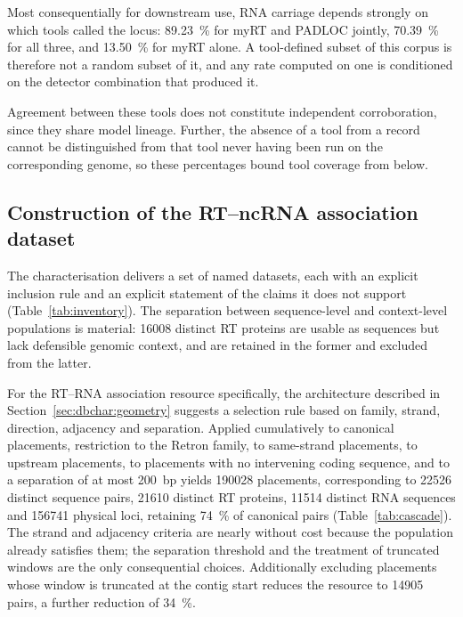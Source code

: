 Most consequentially for downstream use, RNA carriage depends strongly on which tools called the
locus: \SI{89.23}{\percent} for myRT and PADLOC jointly, \SI{70.39}{\percent} for all three, and
\SI{13.50}{\percent} for myRT alone. A tool-defined subset of this corpus is therefore not a random
subset of it, and any rate computed on one is conditioned on the detector combination that produced
it.

Agreement between these tools does not constitute independent corroboration, since they share model
lineage. Further, the absence of a tool from a record cannot be distinguished from that tool never
having been run on the corresponding genome, so these percentages bound tool coverage from below.

\subsection{Construction of the RT--ncRNA association dataset}
\label{sec:dbchar:dataset}

The characterisation delivers a set of named datasets, each with an explicit inclusion rule and an
explicit statement of the claims it does not support (Table~\ref{tab:inventory}). The separation
between sequence-level and context-level populations is material: \num{16008} distinct RT proteins
are usable as sequences but lack defensible genomic context, and are retained in the former and
excluded from the latter.

For the RT--RNA association resource specifically, the architecture described in
Section~\ref{sec:dbchar:geometry} suggests a selection rule based on family, strand, direction,
adjacency and separation. Applied cumulatively to canonical placements, restriction to the Retron
family, to same-strand placements, to upstream placements, to placements with no intervening coding
sequence, and to a separation of at most 200~bp yields \num{190028} placements, corresponding to
\num{22526} distinct sequence pairs, \num{21610} distinct RT proteins, \num{11514} distinct RNA
sequences and \num{156741} physical loci, retaining \SI{74}{\percent} of canonical pairs
(Table~\ref{tab:cascade}). The strand and adjacency criteria are nearly without cost because the
population already satisfies them; the separation threshold and the treatment of truncated windows
are the only consequential choices. Additionally excluding placements whose window is truncated at
the contig start reduces the resource to \num{14905} pairs, a further reduction of
\SI{34}{\percent}.

